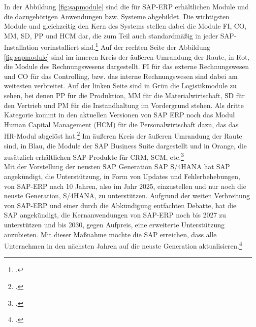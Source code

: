 In der Abbildung \ref{fig:sapmodule} sind die für SAP-ERP erhältlichen Module und die dazugehörigen Anwendungen bzw. Systeme abgebildet. Die wichtigsten Module und gleichzeitig den Kern des Systems stellen dabei die Module FI, CO, MM, SD, PP und HCM dar, die zum Teil auch standardmäßig in jeder SAP-Installation vorinstalliert sind.\footcite[Vgl.][S. 8]{sap-für-wp} Auf der rechten Seite der Abbildung \ref{fig:sapmodule} sind im inneren Kreis der äußeren Umrandung der Raute, in Rot, die Module des Rechnungswesens dargestellt. FI für das externe Rechnungswesen und CO für das Controlling, bzw. das interne Rechnungswesen sind dabei am weitesten verbreitet. Auf der linken Seite sind in Grün die Logistikmodule zu sehen, bei denen PP für die Produktion, MM für die Materialwirtschaft, SD für den Vertrieb und PM für die Instandhaltung im Vordergrund stehen. Als dritte Kategorie kommt in den aktuellen Versionen von SAP ERP noch das Modul Human Capital Management (HCM) für die Personalwirtschaft dazu, das das HR-Modul abgelöst hat.\footcite[Vgl.][]{sap-module2} Im äußeren Kreis der äußeren Umrandung der Raute sind, in Blau, die Module der SAP Business Suite dargestellt und in Orange, die zusätzlich erhältlichen SAP-Produkte für CRM, SCM, etc.\footcite[Vgl.][]{sap-module}
\\Mit der Vorstellung der neusten SAP Generation \glqq{}SAP S/4HANA\grqq{} hat SAP angekündigt, die Unterstützung, in Form von Updates und Fehlerbehebungen, von SAP-ERP nach 10 Jahren, also im Jahr 2025, einzustellen und nur noch die neuste Generation, S/4HANA, zu unterstützen. Aufgrund der weiten Verbreitung von SAP-ERP und einer durch die Abkündigung entfachten Debatte, hat die SAP angekündigt, die Kernanwendungen von SAP-ERP noch bis 2027 zu unterstützen und bis 2030, gegen Aufpreis, eine erweiterte Unterstützung anzubieten. Mit dieser Maßnahme möchte die SAP erreichen, dass alle Unternehmen in den nächsten Jahren auf die neuste Generation aktualisieren.\footcite[Vgl.][]{sap-support}

